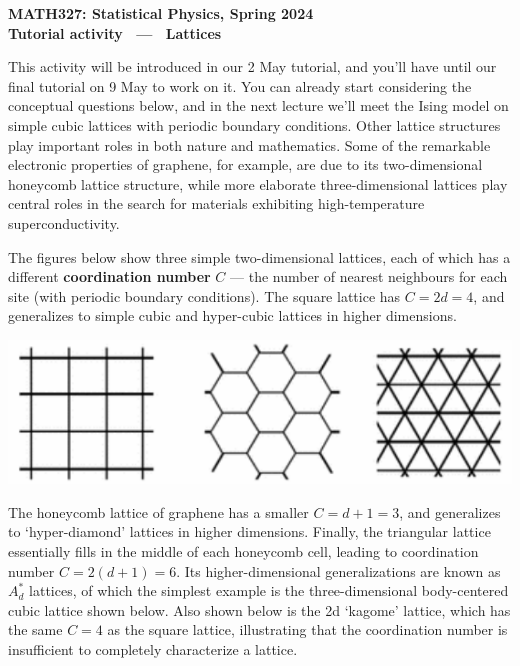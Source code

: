 \documentclass[12 pt]{article} %
\begin{document}
\newcommand{\thisunit}{MATH327 Tutorial (Lattice)}
\newcommand{\moddate}{Last modified 2 May 2024}
\begin{center}
  {\Large \textbf{MATH327: Statistical Physics, Spring 2024}} \\[12 pt]
  {\Large \textbf{Tutorial activity \ --- \ Lattices}} \\[24 pt]
\end{center}

This activity will be introduced in our 2 May tutorial, and you'll have until our final tutorial on 9 May to work on it.
You can already start considering the conceptual questions below, and in the next lecture we'll meet the Ising model on simple cubic lattices with periodic boundary conditions.
Other lattice structures play important roles in both nature and mathematics.
Some of the remarkable electronic properties of graphene, for example, are due to its two-dimensional honeycomb lattice structure, while more elaborate three-dimensional lattices play central roles in the search for materials exhibiting high-temperature superconductivity.

The figures below show three simple two-dimensional lattices, each of which has a different \textbf{coordination number} $C$ --- the number of nearest neighbours for each site (with periodic boundary conditions). %
The square lattice has $C = 2d = 4$, and generalizes to simple cubic and hyper-cubic lattices in higher dimensions.

\begin{center}\includegraphics[width=\textwidth]{figs/lattices.pdf}\end{center}

The honeycomb lattice of graphene has a smaller $C = d + 1 = 3$, and generalizes to `hyper-diamond' lattices in higher dimensions.
Finally, the triangular lattice essentially fills in the middle of each honeycomb cell, leading to coordination number $C = 2(d + 1) = 6$.
Its higher-dimensional generalizations are known as $A_d^*$ lattices, of which the simplest example is the three-dimensional body-centered cubic lattice shown below.
Also shown below is the 2d `kagome' lattice, which has the same $C = 4$ as the square lattice, illustrating that the coordination number is insufficient to completely characterize a lattice.
\end{document}
